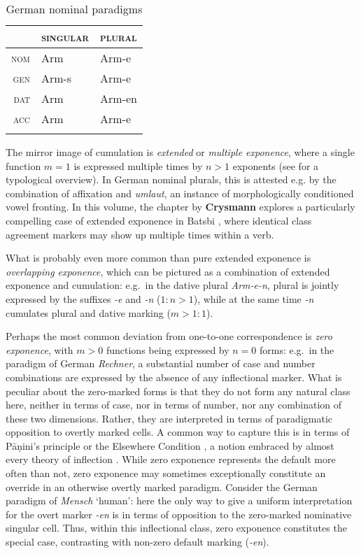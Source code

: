 \documentclass[output=paper]{langscibook}
\begin{document}
\begin{table}[htb]
{    \begin{tabular}{rll}
      \lsptoprule
       & \textsc{singular} & \textsc{plural}\\
      \midrule
        \textsc{nom} & Arm & Arm-e\\
        \textsc{gen} & Arm-s & Arm-e\\
        \textsc{dat} & Arm & Arm-en\\
        \textsc{acc} & Arm & Arm-e\\
      \lspbottomrule
    \end{tabular}
  }
  
  \caption{German nominal paradigms}
  \label{tab:ParaSplit}
\end{table}


The mirror image of cumulation is \emph{extended} or \emph{multiple exponence},
where a single function $m=1$ is expressed multiple times by $n>1$
exponents (see \citealp{caballero_g-harris_a12,Harris17} for a typological
overview). In German nominal plurals,
this is attested e.g. by the combination of affixation and
\textit{umlaut}, an instance of morphologically conditioned vowel
fronting. %
In this volume, the chapter by \textbf{Crysmann} explores a particularly
compelling case of extended exponence in Batsbi \citep{Harris09},
where identical class agreement markers may show up multiple times
within a verb. 



What is probably even more common than pure extended exponence is
\emph{overlapping exponence}, which can be pictured as a combination
of extended exponence and cumulation: e.g.\ in the dative plural
\textit{Arm-e-n}, plural is jointly expressed by the suffixes
\textit{-e} and \textit{-n} ($1:n>1$), while at the same time
\textit{-n} cumulates plural and dative marking ($m>1:1$).   


Perhaps the most common deviation from one-to-one correspondence is
\emph{zero exponence}, with $m>0$ functions being expressed by $n=0$ forms:
e.g.\ in the paradigm of German \textit{Rechner}, a substantial number
of case and number combinations are expressed by the absence of any
inflectional marker. What is peculiar about the zero-marked forms is
that they do not form any natural class here, neither in terms of
case, nor in terms of number, nor any combination of these two
dimensions. Rather, they are interpreted in terms of paradigmatic
opposition to overtly marked cells. A common way to capture this is in
terms of Pāṇini's principle or the Elsewhere Condition
\citep{kiparsky_p85}, a notion embraced by almost every theory of
inflection
\citep[cf.][]{Halle93,Prince93,Anderson92,Stump01,Crysmann:Bonami:2016}.
While zero exponence represents the default more often than not, zero
exponence may sometimes exceptionally constitute an override in an
otherwise overtly marked paradigm.  Consider the German paradigm of
\textit{Mensch} `human': here the only way to give a uniform
interpretation for the overt marker \textit{-en} is in terms of
opposition to the zero-marked nominative singular cell. Thus, within
this inflectional class, zero exponence constitutes the special case,
contrasting with non-zero default marking (\textit{-en}).
\end{document}
